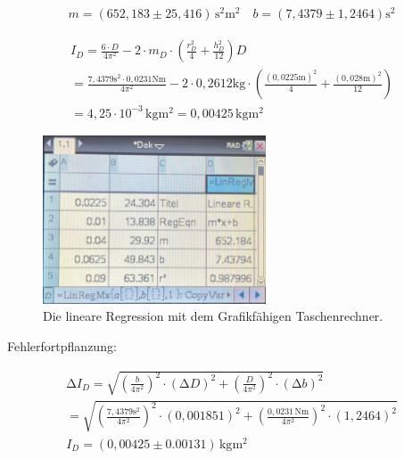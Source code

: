 \begin{align*}
    m = (652,183 \pm 25,416)\,\unit{\second^2\meter^2}\,\,\,\,\,\,b = (7,4379 \pm 1,2464) \unit{\second^2} 
\end{align*}


\begin{center}
    \begin{align*}
        I_{D} = \frac{6 \cdot D}{4\pi^2} - 2 \cdot m_{D} \cdot \left(\frac{r_{D}^2}{4} + \frac{h_{D}^2}{12}\right) {D}  \\
        = \frac{7,4379 \unit{\second^2}  \cdot 0,0231 \unit{\newton\meter}}{4\pi^2} - 2 \cdot 0,2612 \unit{\kilogram} \cdot \left(\frac{(0,0225\unit{\meter})^2}{4}  +  \frac{(0,028\unit{\meter})^2}{12}  \right) \\
        =4,25 \cdot 10^{-3}\, \unit{\kilogram\meter^2} = 0,00425\, \unit{\kilogram\meter^2} 
    \end{align*}
\end{center}

\begin{figure}
    \centering
    \includegraphics[height=50mm]{bilder/gtr.jpeg}
    \caption{Die lineare Regression mit dem Grafikfähigen Taschenrechner. \label{Abbildung7}}
\end{figure}

\begin{flushleft}
    Fehlerfortpflanzung:
\end{flushleft}

\begin{align*}
    \increment I_{D} = \sqrt{  \left(\frac{b}{4\pi^2}\right)^2 \cdot (\increment D)^2 + \left(\frac{D}{4\pi^2}\right)^2 \cdot (\increment b)^2 } \\
    = \sqrt{  \left(\frac{7,4379\unit{\second^2}}{4\pi^2}\right)^2 \cdot (0,001851)^2 + \left(\frac{0,0231 \,\unit{\newton\meter}} {4\pi^2}\right)^2 \cdot (1,2464)^2 } \\
    I_{D} = (0,00425 \pm 0.00131 )\, \unit{\kilogram\meter^2}
\end{align*}

